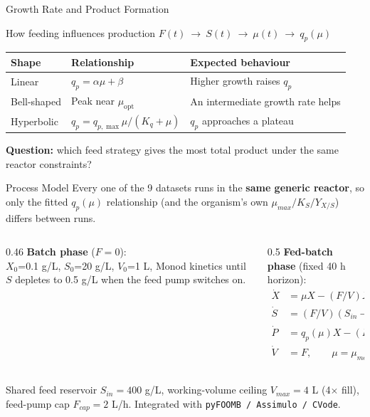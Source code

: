 \documentclass[aspectratio=169, 11pt]{beamer}
\begin{document}
\begin{frame}{Growth Rate and Product Formation}
  \begin{block}{How feeding influences production}
    \centering
    $F(t)\ \longrightarrow\ S(t)\ \longrightarrow\ \mu(t)\ \longrightarrow\ q_p(\mu)$
  \end{block}
  \vspace{0.3cm}
  \begin{center}
    \renewcommand{\arraystretch}{1.5}
    \begin{tabular}{lll}
      \toprule
      \textbf{Shape} & \textbf{Relationship} & \textbf{Expected behaviour} \\
      \midrule
      Linear & $q_p=\alpha\mu+\beta$ & Higher growth raises $q_p$ \\
      Bell-shaped & Peak near $\mu_{\mathrm{opt}}$ & An intermediate growth rate helps \\
      Hyperbolic & $q_p=q_{p,\max}\mu/(K_q+\mu)$ & $q_p$ approaches a plateau \\
      \bottomrule
    \end{tabular}
  \end{center}
  \vspace{0.3cm}
  \textbf{Question:} which feed strategy gives the most total product under the same reactor constraints?
\end{frame}

\begin{frame}{Process Model}
  Every one of the 9 datasets runs in the \textbf{same generic reactor}, so only the
  fitted $q_p(\mu)$ relationship (and the organism's own $\mu_{max}/K_S/Y_{X/S}$) differs
  between runs.

  \vspace{0.2cm}
  \begin{columns}[T]
    \begin{column}{0.46\textwidth}
      \textbf{Batch phase} ($F=0$):\\
      {\small $X_0$=0.1 g/L, $S_0$=20 g/L, $V_0$=1 L, Monod kinetics until $S$ depletes
      to 0.5 g/L when the feed pump switches on.}
    \end{column}
    \begin{column}{0.5\textwidth}
      \textbf{Fed-batch phase} (fixed 40 h horizon):
      \begin{align*}
        \dot X &= \mu X - (F/V)X \\
        \dot S &= (F/V)(S_{in}-S) - (\mu/Y_{X/S})X \\
        \dot P &= q_p(\mu) X - (F/V)P \\
        \dot V &= F,\qquad \mu = \mu_{max}\tfrac{S}{K_S+S}
      \end{align*}
    \end{column}
  \end{columns}

  \vspace{0.15cm}
  {\small Shared feed reservoir $S_{in}=400$ g/L, working-volume ceiling $V_{max}=4$ L
  (4$\times$ fill), feed-pump cap $F_{cap}=2$ L/h. Integrated with
  \texttt{pyFOOMB / Assimulo / CVode}.}
\end{frame}
\end{document}
